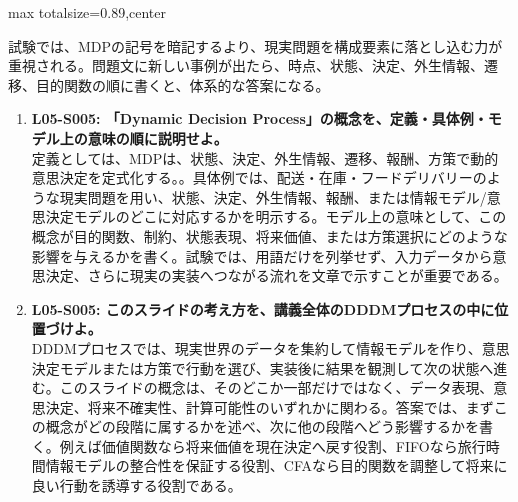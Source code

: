 \begin{minipage}[t]{0.58\textwidth}
\begin{adjustbox}{max totalsize={\textwidth}{0.89\textheight},center}
\begin{minipage}{\textwidth}
試験では、MDPの記号を暗記するより、現実問題を構成要素に落とし込む力が重視される。問題文に新しい事例が出たら、時点、状態、決定、外生情報、遷移、目的関数の順に書くと、体系的な答案になる。\par{}\begin{enumerate}\item \textbf{L05-S005: 「Dynamic Decision Process」の概念を、定義・具体例・モデル上の意味の順に説明せよ。}\\定義としては、MDPは、状態、決定、外生情報、遷移、報酬、方策で動的意思決定を定式化する。。具体例では、配送・在庫・フードデリバリーのような現実問題を用い、状態、決定、外生情報、報酬、または情報モデル/意思決定モデルのどこに対応するかを明示する。モデル上の意味として、この概念が目的関数、制約、状態表現、将来価値、または方策選択にどのような影響を与えるかを書く。試験では、用語だけを列挙せず、入力データから意思決定、さらに現実の実装へつながる流れを文章で示すことが重要である。\item \textbf{L05-S005: このスライドの考え方を、講義全体のDDDMプロセスの中に位置づけよ。}\\DDDMプロセスでは、現実世界のデータを集約して情報モデルを作り、意思決定モデルまたは方策で行動を選び、実装後に結果を観測して次の状態へ進む。このスライドの概念は、そのどこか一部だけではなく、データ表現、意思決定、将来不確実性、計算可能性のいずれかに関わる。答案では、まずこの概念がどの段階に属するかを述べ、次に他の段階へどう影響するかを書く。例えば価値関数なら将来価値を現在決定へ戻す役割、FIFOなら旅行時間情報モデルの整合性を保証する役割、CFAなら目的関数を調整して将来に良い行動を誘導する役割である。\end{enumerate}
\end{minipage}
\end{adjustbox}
\end{minipage}


